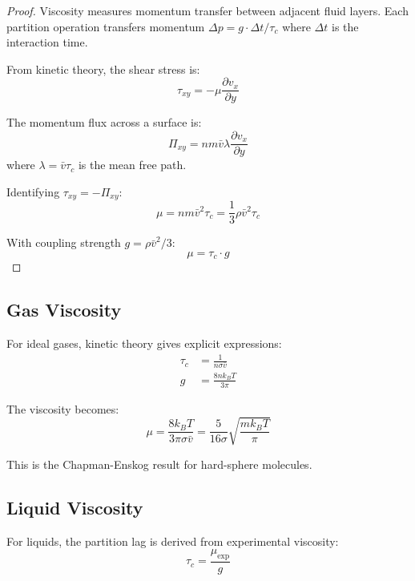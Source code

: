 \documentclass[aps,prl,twocolumn,superscriptaddress,floatfix]{revtex4-2}
\begin{document}
\begin{proof}
Viscosity measures momentum transfer between adjacent fluid layers. Each partition operation transfers momentum $\Delta p = g \cdot \Delta t / \tau_c$ where $\Delta t$ is the interaction time.

From kinetic theory, the shear stress is:
\begin{equation}
\tau_{xy} = -\mu \frac{\partial v_x}{\partial y}
\end{equation}

The momentum flux across a surface is:
\begin{equation}
\Pi_{xy} = n m \bar{v} \lambda \frac{\partial v_x}{\partial y}
\end{equation}
where $\lambda = \bar{v} \tau_c$ is the mean free path.

Identifying $\tau_{xy} = -\Pi_{xy}$:
\begin{equation}
\mu = n m \bar{v}^2 \tau_c = \frac{1}{3} \rho \bar{v}^2 \tau_c
\end{equation}

With coupling strength $g = \rho \bar{v}^2 / 3$:
\begin{equation}
\mu = \tau_c \cdot g
\end{equation}
\end{proof}

\subsection{Gas Viscosity}

For ideal gases, kinetic theory gives explicit expressions:
\begin{align}
\tau_c &= \frac{1}{n\sigma\bar{v}} \\
g &= \frac{8nk_BT}{3\pi}
\end{align}

The viscosity becomes:
\begin{equation}
\mu = \frac{8k_BT}{3\pi\sigma\bar{v}} = \frac{5}{16\sigma}\sqrt{\frac{mk_BT}{\pi}}
\end{equation}

This is the Chapman-Enskog result for hard-sphere molecules.

\subsection{Liquid Viscosity}

For liquids, the partition lag is derived from experimental viscosity:
\begin{equation}
\tau_c = \frac{\mu_{\text{exp}}}{g}
\end{equation}
\end{document}
